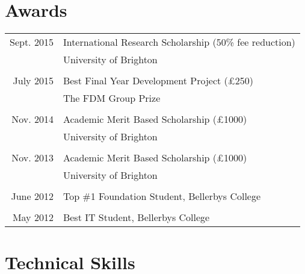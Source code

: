 \documentclass[a4paper,11pt]{article} %
\begin{document}

\section{Awards}

\begin{tabular}{rl}
Sept. 2015 & International Research Scholarship (50\% fee reduction)\\ &University of Brighton\\
\\
July 2015 & Best Final Year Development Project (£250)\\ &The FDM Group Prize \\
\\
Nov. 2014 & Academic Merit Based Scholarship (£1000)\\ &University of Brighton \\
\\
Nov. 2013 & Academic Merit Based Scholarship (£1000)\\ &University of Brighton \\
\\
June 2012 & Top \#1 Foundation Student, Bellerbys College \\
\\
May 2012 & Best IT Student, Bellerbys College \\
\end{tabular}





\section{Technical Skills}
\end{document}
